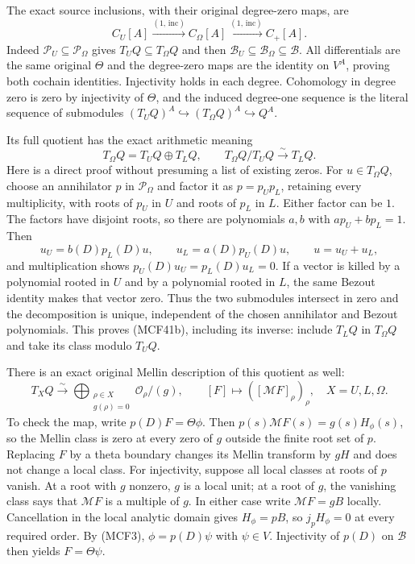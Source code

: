 \documentclass[11pt,a4paper]{article}
\begin{document}
The exact source inclusions, with their original degree-zero maps, are
\[
C_U[A]\xrightarrow{(1,\,\mathrm{inc})}C_\Omega[A]
       \xrightarrow{(1,\,\mathrm{inc})}C_+[A].
\tag{MCF41a}
\]
Indeed $\mathcal P_U\subseteq\mathcal P_\Omega$ gives
$T_UQ\subseteq T_\Omega Q$ and then
$\mathscr B_U\subseteq\mathscr B_\Omega\subseteq\mathscr B$.
All differentials are the same original $\Theta$ and the degree-zero
maps are the identity on $V^A$, proving both cochain identities.
Injectivity holds in each degree.  Cohomology in degree zero is zero
by injectivity of $\Theta$, and the induced degree-one sequence is
the literal sequence of submodules
$ (T_UQ)^A\hookrightarrow(T_\Omega Q)^A\hookrightarrow Q^A$.

Its full quotient has the exact arithmetic meaning
\[
T_\Omega Q=T_UQ\oplus T_LQ,\qquad
T_\Omega Q/T_UQ\xrightarrow{\sim}T_LQ.
\tag{MCF41b}
\]
Here is a direct proof without presuming a list of existing zeros.
For $u\in T_\Omega Q$, choose an annihilator $p$ in
$\mathcal P_\Omega$ and factor it as $p=p_Up_L$, retaining every
multiplicity, with roots of $p_U$ in $U$ and roots of $p_L$ in $L$.
Either factor can be $1$.  The factors have disjoint roots, so there
are polynomials $a,b$ with $ap_U+bp_L=1$.  Then
\[
u_U=b(D)p_L(D)u,\qquad u_L=a(D)p_U(D)u,
\qquad u=u_U+u_L,
\tag{MCF41c}
\]
and multiplication shows $p_U(D)u_U=p_L(D)u_L=0$.
If a vector is killed by a polynomial rooted in $U$ and by a
polynomial rooted in $L$, the same Bezout identity makes that vector
zero.  Thus the two submodules intersect in zero and the decomposition
is unique, independent of the chosen annihilator and Bezout
polynomials.  This proves (MCF41b), including its inverse: include
$T_LQ$ in $T_\Omega Q$ and take its class modulo $T_UQ$.

There is an exact original Mellin description of this quotient as well:
\[
T_XQ\xrightarrow{\sim}
\bigoplus_{\substack{\rho\in X\\g(\rho)=0}}
                     \mathcal O_\rho/(g),\qquad
[F]\longmapsto([\mathcal MF]_\rho)_\rho,
\quad X=U,L,\Omega.
\tag{MCF41d}
\]
To check the map, write $p(D)F=\Theta\phi$.  Then
$p(s)\mathcal MF(s)=g(s)H_\phi(s)$, so the Mellin class is zero
at every zero of $g$ outside the finite root set of $p$.  Replacing
$F$ by a theta boundary changes its Mellin transform by $gH$ and
does not change a local class.  For injectivity, suppose all local
classes at roots of $p$ vanish.  At a root with $g$ nonzero, $g$ is
a local unit; at a root of $g$, the vanishing class says that
$\mathcal MF$ is a multiple of $g$.  In either case write
$\mathcal MF=gB$ locally.  Cancellation in the local analytic domain
gives $H_\phi=pB$, so $j_pH_\phi=0$ at every required order.
By (MCF3), $\phi=p(D)\psi$ with $\psi\in V$.  Injectivity of $p(D)$
on $\mathscr B$ then yields $F=\Theta\psi$.
\end{document}
